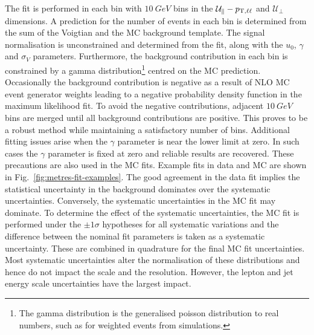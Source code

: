 %
The fit is performed in each \ptll bin with $\SI{10}{GeV}$ bins in the $\mathcal{U}_{\parallel}-p_{\mathrm{T},\ell\ell}$ and $\mathcal{U}_{\perp}$ dimensions. A prediction for the number of events in each bin is determined from the sum of the Voigtian and the MC background template. The signal normalisation is unconstrained and determined from the fit, along with the $u_0$, $\gamma$ and $\sigma_V$ parameters. Furthermore, the background contribution in each bin is constrained by a gamma distribution\footnote{The gamma distribution is the generalised poisson distribution to real numbers, such as for weighted events from simulations.} centred on the MC prediction. Occasionally the background contribution is negative as a result of NLO MC event generator weights leading to a negative probability density function in the maximum likelihood fit. To avoid the negative contributions, adjacent $\SI{10}{GeV}$ bins are merged until all background contributions are positive. This proves to be a robust method while maintaining a satisfactory number of bins. Additional fitting issues arise when the $\gamma$ parameter is near the lower limit at zero. In such cases the $\gamma$ parameter is fixed at zero and reliable results are recovered. These precautions are also used in the MC fits. Example fits in data and MC are shown in Fig.~\ref{fig:metres-fit-examples}. The good agreement in the data fit implies the statistical uncertainty in the background dominates over the systematic uncertainties. Conversely, the systematic uncertainties in the MC fit may dominate. To determine the effect of the systematic uncertainties, the MC fit is performed under the $\pm 1\sigma$ hypotheses for all systematic variations and the difference between the nominal fit parameters is taken as a systematic uncertainty. These are combined in quadrature for the final MC fit uncertainties. Most systematic uncertainties alter the normalisation of these distributions and hence do not impact the scale and the resolution. However, the lepton and jet energy scale uncertainties have the largest impact.

